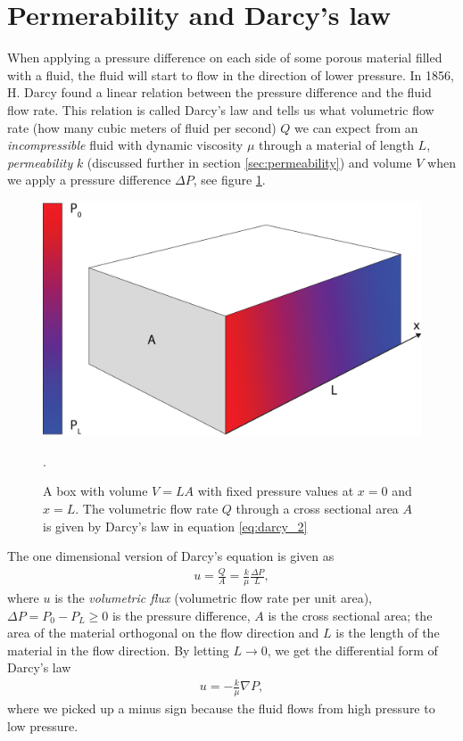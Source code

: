 \section{Permerability and Darcy's law}
\label{sec:darcy_law}
When applying a pressure difference on each side of some porous material filled with a fluid, the fluid will start to flow in the direction of lower pressure. In 1856, H. Darcy found a linear relation between the pressure difference and the fluid flow rate. This relation is called Darcy's law and tells us what volumetric flow rate (how many cubic meters of fluid per second) $Q$ we can expect from an \textit{incompressible} fluid with dynamic viscosity $\mu$ through a material of length $L$, \textit{permeability} $k$ (discussed further in section \ref{sec:permeability}) and volume $V$ when we apply a pressure difference $\Delta P$, see figure \ref{fig:darcys_law}. 
\begin{figure}[h]
\begin{center}
\includegraphics[width=\textwidth, trim=0cm 0cm 0cm 0cm, clip]{kinetic_theory/figures/darcy.eps}
\end{center}
\caption{A box with volume $V=LA$ with fixed pressure values at $x=0$ and $x=L$. The volumetric flow rate $Q$ through a cross sectional area $A$ is given by Darcy's law in equation \eqref{eq:darcy_2}}.
\label{fig:darcys_law}
\end{figure}
The one dimensional version of Darcy's equation is given as 
\begin{align}
\label{eq:darcy_1}
	u = \frac{Q}{ A} = \frac{k}{ \mu}\frac{\Delta P}{ L},
\end{align}
where $u$ is the \textit{volumetric flux} (volumetric flow rate per unit area), $\Delta P = P_0 - P_L \geq 0$ is the pressure difference, $A$ is the cross sectional area; the area of the material orthogonal on the flow direction and $L$ is the length of the material in the flow direction. By letting $L\rightarrow 0$, we get the differential form of Darcy's law
\begin{align}
\label{eq:darcy_2}
	u = -\frac{k}{ \mu}{\nabla P},
\end{align}
where we picked up a minus sign because the fluid flows from high pressure to low pressure. 


